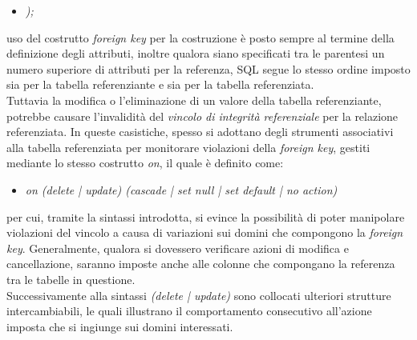 \documentclass{article}
\begin{document}
\begin{itemize}[label={ }, leftmargin=1cm]
    \item \textit{);}
\end{itemize}
uso del costrutto \textit{foreign key} per la costruzione è posto sempre al termine della definizione degli attributi, inoltre qualora siano specificati tra le parentesi un numero superiore di attributi per la referenza, SQL segue lo stesso ordine imposto sia per la tabella referenziante e sia per la tabella referenziata.\vspace{14pt}\\
Tuttavia la modifica o l'eliminazione di un valore della tabella referenziante, potrebbe causare l'invalidità del \textit{vincolo di integrità referenziale} per la relazione referenziata. In queste casistiche, spesso si adottano degli strumenti associativi alla tabella referenziata per monitorare violazioni della \textit{foreign key}, gestiti mediante lo stesso costrutto \textit{on}, il quale è definito come:
\begin{itemize} [label={ }, leftmargin=1cm]
    \item \textit{on (delete | update) (cascade | set null | set default | no action)}
\end{itemize}
per cui, tramite la sintassi introdotta, si evince la possibilità di poter manipolare violazioni del vincolo a causa di variazioni sui domini che compongono la \textit{foreign key}. Generalmente, qualora si dovessero verificare azioni di modifica e cancellazione, saranno imposte anche alle colonne che compongano la referenza tra le tabelle in questione.\\
Successivamente alla sintassi \textit{(delete | update)} sono collocati ulteriori strutture intercambiabili, le quali illustrano il comportamento consecutivo all'azione imposta che si ingiunge sui domini interessati.
\end{document}
